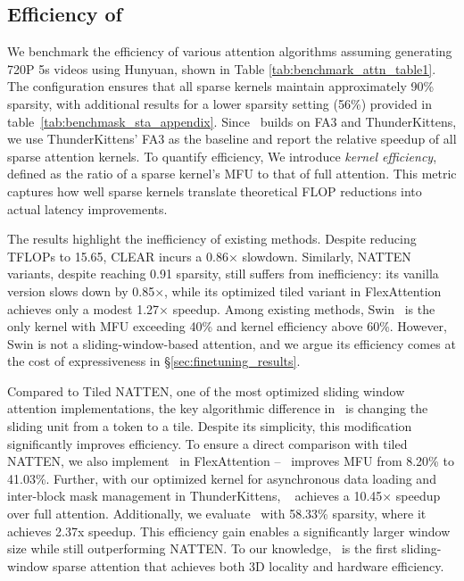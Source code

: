 \subsection{Efficiency of ~\methodname}
\label{sec:benchmark_Attn}
We benchmark the efficiency of various attention algorithms assuming generating 720P 5s videos using Hunyuan, shown in Table \ref{tab:benchmark_attn_table1}. The configuration ensures that all sparse kernels maintain approximately 90\% sparsity, with additional results for a lower sparsity setting (56\%) provided in table~\ref{tab:benchmask_sta_appendix}. 
Since \methodnameshort~builds on FA3 and ThunderKittens, we use ThunderKittens' FA3 as the baseline and report the relative speedup of all sparse attention kernels. To quantify efficiency, We introduce \emph{kernel efficiency}, defined as the ratio of a sparse kernel's MFU to that of full attention. This metric captures how well sparse kernels translate theoretical FLOP reductions into actual latency improvements.

The results highlight the inefficiency of existing methods.
Despite reducing TFLOPs to 15.65, CLEAR incurs a 0.86× slowdown. 
Similarly,  NATTEN variants, despite reaching 0.91 sparsity, still suffers from inefficiency: its vanilla version slows down by 0.85$\times$, while its optimized tiled variant in FlexAttention achieves only a modest 1.27$\times$ speedup. 
Among existing methods, Swin~\citep{liu2021swin} is the only kernel with MFU exceeding 40\% and kernel efficiency above 60\%. However, Swin is not a sliding-window-based attention, and we argue its efficiency comes at the cost of expressiveness in \S\ref{sec:finetuning_results}.
 
Compared to Tiled NATTEN, one of the most optimized sliding window attention implementations, the key algorithmic difference in \methodname~is changing the sliding unit from a token to a tile. Despite its simplicity, this modification significantly improves efficiency. 
To ensure a direct comparison with tiled NATTEN, we also implement \methodnameshort~in FlexAttention -- \methodnameshort~improves MFU from 8.20\% to 41.03\%. Further, with our optimized kernel for asynchronous data loading and inter-block mask management in ThunderKittens, \methodnameshort~ achieves a 10.45$\times$ speedup over full attention. Additionally, we evaluate \methodnameshort~with 58.33\% sparsity, where it achieves 2.37x speedup. This efficiency gain enables a significantly larger window size while still outperforming NATTEN. 
To our knowledge, \methodnameshort~is the first sliding-window sparse attention that achieves both 3D locality and hardware efficiency. 

